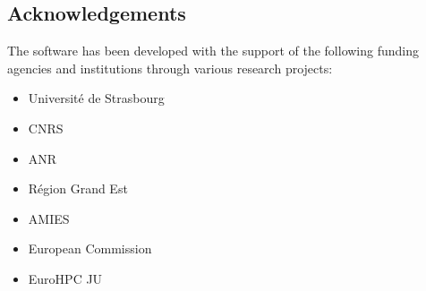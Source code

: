 \subsection{Acknowledgements}
\label{sec::Feelpp:acknowledgements}
The software has been developed with the support of the following funding agencies and institutions through various research projects: 
\begin{itemize}
   \item Université de Strasbourg
   \item CNRS
   \item ANR
   \item Région Grand Est
   \item AMIES
   \item European Commission
   \item EuroHPC JU
\end{itemize}
